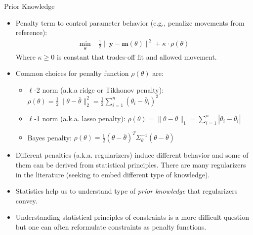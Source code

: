\documentclass[handout,9pt]{beamer}
\begin{document}
%
\begin{frame}{Prior Knowledge}

\begin{itemize}
\setlength{\itemsep}{5pt}
\item Penalty term to control parameter behavior (e.g., penalize movements from reference):
\begin{align*}
\min_{\theta}& \; \frac{1}{2}\|\mathbf{y}- \mathbf{m}(\theta)\|^2+\kappa\cdot  \rho(\theta)
\end{align*}
Where $\kappa\geq 0$ is constant that trades-off fit and allowed movement. 
\item Common choices for penalty function $\rho(\theta)$ are:
\begin{itemize}
\setlength{\itemsep}{5pt}
\item  $\ell$-2 norm (a.k.a ridge or Tikhonov penalty): $\rho(\theta)=\frac{1}{2}\|\theta-\bar{\theta}\|_2^2=\frac{1}{2}\sum_{i=1}^n(\theta_i-\bar{\theta}_i)^2$
\item $\ell$-1 norm (a.k.a. lasso penalty): $\rho(\theta)=\|\theta-\bar{\theta}\|_1=\sum_{i=1}^n
|\theta_i-\bar{\theta}_i|$
\item Bayes penalty: $\rho(\theta)=\frac{1}{2}(\theta-\bar{\theta})^T\Sigma_\theta^{-1} (\theta -\bar{\theta})$
\end{itemize}
\item Different penalties  (a.k.a. regularizers) induce different behavior and some of them can be derived from statistical principles. There are many regularizers in the literature (seeking to embed different type of knowledge).
\item Statistics help us to understand type of {\em prior knowledge} that regularizers convey. 
\item Understanding statistical principles of constraints is a more difficult question but one can often reformulate constraints as penalty functions. 
\end{itemize}

\end{frame}
\end{document}

